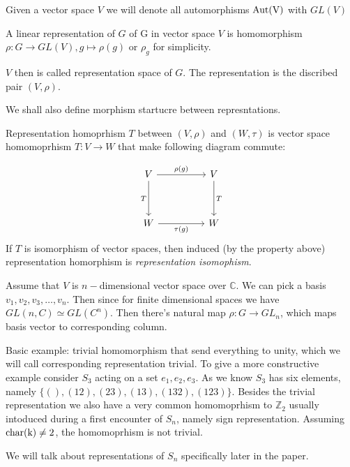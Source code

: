 \documentclass{amsart}
\def\char{\rm char}
\def\aut{\rm Aut}
\begin{document}
\begin{definition}
    Given a vector space $V$ we will denote all automorphisms $\aut(V)$ with $GL(V)$
\end{definition}

\begin{definition}
    A linear representation of $G$ of G in vector space $V$ is homomorphism $\rho: G \to GL(V), g \mapsto \rho(g)$ or $\rho_g$ for simplicity.
\end{definition}

$V$ then is called representation space of $G$. The representation is the discribed pair $(V, \rho)$.

We shall also define morphism startucre between represntations.

\begin{definition}
 Representation homoprhism $T$ between $(V, \rho)$ and $(W, \tau)$ is vector space homomoprhism $T: V \to W$ that make following diagram commute:
\end{definition}

\[\begin{tikzcd}
	V && V \\
	\\
	W && W
	\arrow["{\rho(g)}", from=1-1, to=1-3]
	\arrow["T", from=1-3, to=3-3]
	\arrow["T"', from=1-1, to=3-1]
	\arrow["{\tau(g)}"', from=3-1, to=3-3]
\end{tikzcd}\]
If $T$ is isomorphism of vector spaces, then induced (by the property above) representation homorphism is \textit{representation isomophism}.

Assume that $V$ is $n-$dimensional vector space over $\mathbb{C}$. We can pick a basis $v_1, v_2, v_3,\dots, v_n$. Then since for finite dimensional spaces we have $GL(n, C) \simeq GL(C^n)$. Then there's natural map $\rho: G\to GL_n$, which maps basis vector to corresponding column.

Basic example:  trivial homomorphism that send everything to unity, which we will call corresponding representation trivial. 
To give a more constructive example consider $S_3$ acting on a set $e_1, e_2, e_3$.
As we know $S_3$ has six elements, namely $\{ (), (12), (23), (13), (132), (123) \}$. 
Besides the trivial representation we also have a very common homomoprhism to $\mathbb{Z}_2$ usually intoduced during a first encounter of $S_n$, namely sign representation.
Assuming $\char(k) \neq 2$, the homomoprhism is not trivial. 


We will talk about representations of $S_n$ specifically later in the paper.
\end{document}
